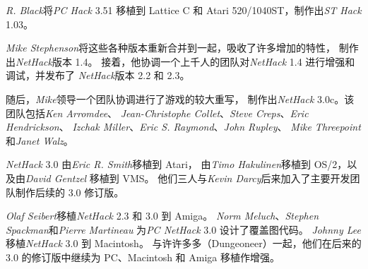 \documentclass[a4paper, 10pt]{article}
\newcommand{\nd}{\noindent}
\begin{document}
\medskip
{\it R. Black\/}将{\it PC Hack\/} 3.51 移植到 Lattice C 和 Atari 
520/1040ST，制作出{\it ST Hack\/} 1.03。

\medskip
{\it Mike Stephenson\/}将这些各种版本重新合并到一起，吸收了许多增加的特性，
制作出{\it NetHack\/}版本 1.4。
接着，他协调一个上千人的团队对{\it NetHack\/} 1.4 进行增强和调试，并发布了
{\it NetHack\/}版本 2.2 和 2.3。

\medskip
随后，{\it Mike}领导一个团队协调进行了游戏的较大重写，
制作出{\it NetHack\/} 3.0c。该团队包括{\it Ken Arromdee}、
{\it Jean-Christophe Collet}、{\it Steve Creps}、{\it Eric Hendrickson}、
{\it Izchak Miller}、{\it Eric S. Raymond}、{\it John Rupley}、
{\it Mike Threepoint}和{\it Janet Walz}。

\medskip
{\it NetHack\/} 3.0 由{\it Eric R. Smith}移植到 Atari，
由{\it Timo Hakulinen}移植到 OS/2，以及由{\it David Gentzel} 移植到 VMS。
他们三人与{\it Kevin Darcy\/}后来加入了主要开发团队制作后续的 3.0 修订版。

\medskip
{\it Olaf Seibert\/}移植{\it NetHack\/} 2.3 和 3.0 到 Amiga。
{\it Norm Meluch}、{\it Stephen Spackman\/}和{\it Pierre Martineau\/}
为{\it PC NetHack\/} 3.0 设计了覆盖图代码。
{\it Johnny Lee\/}移植{\it NetHack\/} 3.0 到 Macintosh。
与许许多多\zhTransDungeoneer{}（Dungeoneer）一起，他们在后来的 3.0 的修订版中继续为
PC、Macintosh 和 Amiga 移植作增强。
\end{document}
